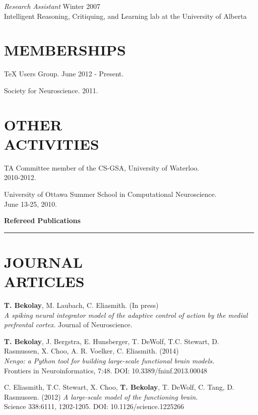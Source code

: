 \documentclass[line,margin]{res}
\begin{document}
\begin{resume}
{\sl Research Assistant} \hfill Winter 2007 \\
Intelligent Reasoning, Critiquing, and Learning lab at the University of Alberta

\section{MEMBERSHIPS}

TeX Users Group. June 2012 - Present.

Society for Neuroscience. 2011.

\section{OTHER \\ ACTIVITIES}

TA Committee member of the CS-GSA, University of Waterloo. \\
2010-2012.

University of Ottawa Summer School in Computational Neuroscience. \\
June 13-25, 2010.

\clearpage

{\Large \bf Refereed Publications} \\ \vspace{-8pt} \hrule

\section{JOURNAL \\ARTICLES}

\textbf{T. Bekolay}, M. Laubach, C. Eliasmith. (In press) \\
  {\sl A spiking neural integrator model of the adaptive control of action
  by the medial prefrontal cortex.} Journal of Neuroscience.

\textbf{T. Bekolay}, J. Bergstra, E. Hunsberger, T. DeWolf, T.C. Stewart,
  D. Rasmussen, X. Choo, A. R. Voelker, C. Eliasmith. (2014) \\
  {\sl Nengo: a Python tool for building large-scale functional
  brain models.} \\ Frontiers in Neuroinformatics, 7:48.
  DOI: 10.3389/fninf.2013.00048

C. Eliasmith, T.C. Stewart, X. Choo, \textbf{T. Bekolay},
  T. DeWolf, C. Tang, D. Rasmussen. (2012)
  {\sl A large-scale model of the functioning brain.} \\
  Science 338:6111, 1202-1205. DOI: 10.1126/science.1225266


\end{resume}
\end{document}

